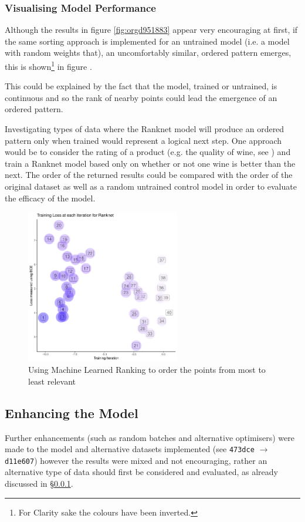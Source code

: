 \documentclass[a4paper,11pt,twoside]{article}
\begin{document}
\subsubsection{Visualising Model Performance}
\label{sec:org5b11d1b}
Although the results in figure \ref{fig:orgd951883} appear very
encouraging at first, if the same sorting approach is implemented
for an untrained model (i.e. a model with random weights that), an
uncomfortably similar, ordered pattern emerges, this is
shown\footnote{For Clarity sake the colours have been inverted.} in figure .

This could be explained by the fact that the model, trained or untrained, 
is continuous and so the rank of nearby points could lead the
emergence of an ordered pattern.

Investigating types of data where the Ranknet model will produce an ordered
pattern only when trained would represent a logical next step. One
approach would be to consider the rating of a product (e.g. the
quality of wine, see \cite{cortezModelingWinePreferences2009}) and
train a Ranknet model based only on whether or not one wine is
better than the next. The order of the returned results could be
compared with the order of the original dataset as well as a
random untrained control model in order to evaluate the efficacy
of the model.


\begin{figure}[htbp]
\centering
\includegraphics[width=0.6\textwidth]{media/ordered_blobs_untrained.png}
\caption{\label{fig:org9af4b53}Using Machine Learned Ranking to order the points from most to least relevant}
\end{figure}


\subsection{Enhancing the Model}
\label{sec:org44edf73}
Further enhancements (such as random batches and alternative
optimisers) were made to the model and alternative datasets
implemented (see \texttt{473dce} \(\rightarrow\) \texttt{d11e607}) however the
results were mixed and not encouraging, rather an alternative type
of data should first be considered and evaluated, as already
discussed in \S \ref{sec:org5b11d1b}.
\end{document}
